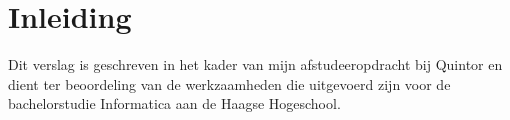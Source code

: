 \chapter{Inleiding}

Dit verslag is geschreven in het kader van mijn afstudeeropdracht bij Quintor en dient ter beoordeling van de werkzaamheden die uitgevoerd zijn voor de bachelorstudie Informatica aan de Haagse Hogeschool.